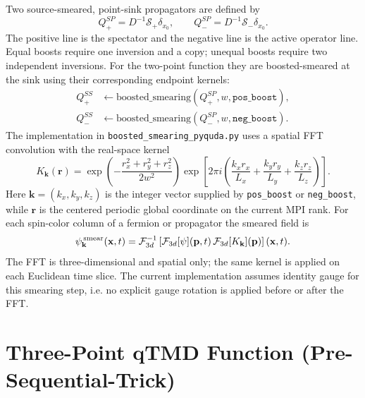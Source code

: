 \documentclass[11pt,a4paper]{article}
\begin{document}
Two source-smeared, point-sink propagators are defined by
\begin{equation}
 Q_{+}^{SP}=D^{-1}\mathcal S_{+}\delta_{x_0},\qquad
 Q_{-}^{SP}=D^{-1}\mathcal S_{-}\delta_{x_0}.
 \label{eq:qtmd_source_lines}
\end{equation}
The positive line is the spectator and the negative line is the active
operator line.  Equal boosts require one inversion and a copy; unequal boosts
require two independent inversions.  For the two-point function they are
boosted-smeared at the sink using their corresponding endpoint kernels:
\begin{align}
  Q_+^{SS} &\leftarrow \text{boosted\_smearing}(Q_+^{SP},
                      w, \texttt{pos\_boost}), \\
  Q_-^{SS} &\leftarrow \text{boosted\_smearing}(Q_-^{SP},
                      w, \texttt{neg\_boost}).
\end{align}
The implementation in \verb|boosted_smearing_pyquda.py| uses a spatial
FFT convolution with the real-space kernel
\begin{equation}
  K_{\mathbf{k}}(\mathbf{r})
  =
  \exp\!\left(-\frac{r_x^2+r_y^2+r_z^2}{2w^2}\right)
  \exp\!\left[
    2\pi i
    \left(
      \frac{k_x r_x}{L_x}
      + \frac{k_y r_y}{L_y}
      + \frac{k_z r_z}{L_z}
    \right)
  \right].
  \label{eq:qtmd_smear_kernel}
\end{equation}
Here \(\mathbf{k}=(k_x,k_y,k_z)\) is the integer vector supplied by
\texttt{pos\_boost} or \texttt{neg\_boost}, while \(\mathbf{r}\) is the centered
periodic global coordinate on the current MPI rank.  For each spin-color column
of a fermion or propagator the smeared field is
\begin{equation}
  \psi^{\,{\rm smear}}_{\mathbf{k}}(\mathbf{x},t)
  =
  \mathcal{F}^{-1}_{3d}
  \left[
    \mathcal{F}_{3d}[\psi](\mathbf{p},t)\,
    \mathcal{F}_{3d}[K_{\mathbf{k}}](\mathbf{p})
  \right](\mathbf{x},t).
  \label{eq:qtmd_fft_smear}
\end{equation}
The FFT is three-dimensional and spatial only; the same kernel is applied on
each Euclidean time slice.  The current implementation assumes identity gauge
for this smearing step, i.e. no explicit gauge rotation is applied before or
after the FFT.

\section{Three-Point qTMD Function (Pre-Sequential-Trick)}
\label{sec:threept}
\end{document}
